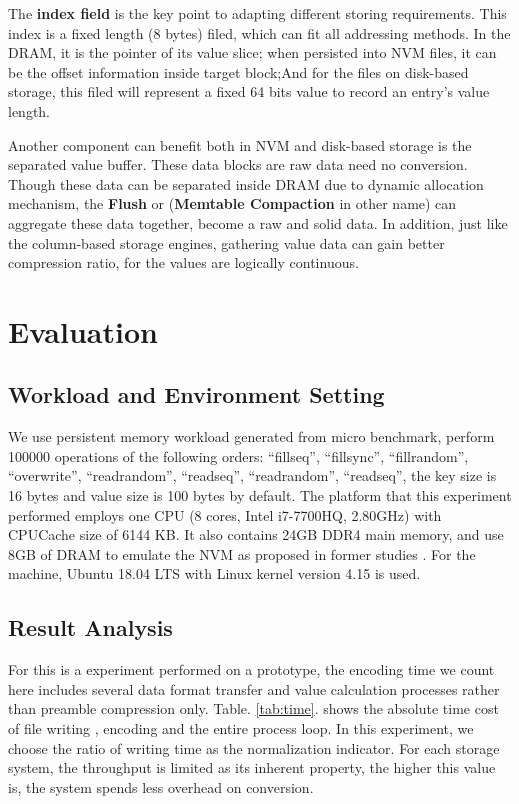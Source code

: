 The \textbf{index field} is the key point to adapting different storing requirements. This index is a fixed length (8 bytes) filed, which can fit all addressing methods. In the DRAM, it is the pointer of its value slice; when persisted into NVM files, it can be the offset information inside target block;And for the files on disk-based storage, this filed will represent a fixed 64 bits value to record an entry's value length.


Another component can benefit both in NVM and disk-based storage is the separated value buffer. These data blocks are raw data need no conversion. Though these data can be separated inside DRAM due to dynamic allocation mechanism, the \textbf{Flush} or (\textbf{Memtable Compaction} in other name) can aggregate these data together, become a raw and solid data. In addition, just like the column-based storage engines, gathering value data can gain better compression ratio, for the values are logically continuous.

\section{Evaluation}

\subsection{Workload and Environment Setting}

We use persistent memory workload generated from micro benchmark, perform 100000 operations of the following orders: ``fillseq'', ``fillsync'', ``fillrandom'', ``overwrite'', ``readrandom'', ``readseq'', ``readrandom'', ``readseq'', the key size is 16 bytes and value size is 100 bytes by default. The platform that this experiment performed employs one CPU (8 cores, Intel i7-7700HQ, 2.80GHz) with CPUCache size of 6144 KB. It also contains 24GB DDR4 main memory, and use 8GB of DRAM to emulate the NVM as proposed in former studies\cite{kannan2018redesigning,kaiyrakhmet2019slm} . For the machine, Ubuntu 18.04 LTS with Linux kernel version 4.15 is used.

\subsection{Result Analysis} 
For this is a experiment performed on a prototype, the encoding time we count here includes several data format transfer and value calculation processes rather than preamble compression only. Table. \ref{tab:time}. shows the absolute time cost of file writing , encoding and the entire process loop. In this experiment, we choose the ratio of writing time as the normalization indicator. For each storage system, the throughput is limited as its inherent property, the higher this value is, the system spends less overhead on conversion.

